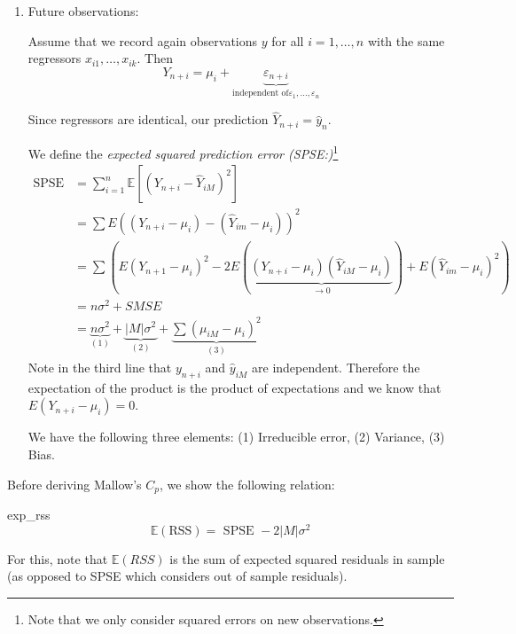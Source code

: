 \documentclass[11pt, %
	oneside, %
	english, %
	onehalfspacing, %
	]{article} %
\numberwithin{equation}{section}
\begin{document}
\begin{enumerate}
	\item Future observations:

        Assume that we record again observations $y$ for all $i = 1, \dots, n$ with the same regressors $x_{i1}, \dots, x_{ik}$. Then
        $$
        Y_{n+i}=\mu_i+\underbrace{ \varepsilon_{n+i} }_{ \text{independent of} \varepsilon_1, \dots, \varepsilon_n }
        $$

        Since regressors are identical, our prediction $\hat{Y}_{n+i} = \hat{y}_n$.

        We define the \emph{expected squared prediction error (SPSE:)}\footnote{Note that we only consider squared errors on new observations.}
        \begin{equation}\label{eq:spse_rel}
            \begin{aligned}
                \text {SPSE}& = \sum_{i=1}^n \mathbb{E}\left[\left(Y_{n+i}-\hat{Y}_{i M}\right)^2\right] \\
                & =\sum E\left(\left(Y_{n+i}-\mu_i\right)-\left(\hat{Y}_{i m}-\mu_i\right)\right)^2 \\
                & =\sum(E\left(Y_{n+1}-\mu_i\right)^2-2 E\left(\underbrace{\left(Y_{n+i} - \mu_i\right) \left( \hat{Y}_{iM} - \mu_i \right) }_{\rightarrow 0}\right)+E\left(\hat{Y}_{i m}-\mu_i\right)^2) \\
                & =n \sigma^2+S M S E \\
                &=\underbrace{ n \sigma^2 }_{ (1) }+\underbrace{ |M| \sigma^2 }_{ (2) }+\underbrace{ \sum\left(\mu_{i M}-\mu_i\right)^2 }_{ (3) }
                \end{aligned}
        \end{equation}
        Note in the third line that $y_{n+i}$ and $\hat{y}_{iM}$ are independent. Therefore the expectation of the product is the product of expectations and we know that $E(Y_{n+i} - \mu_i) = 0$.

        We have the following three elements: (1) Irreducible error, (2) Variance, (3) Bias.
\end{enumerate}

Before deriving Mallow's $C_p$, we show the following relation:

\begin{lemma}{}{exp_rss}
    $$
    \mathbb{E} (\text {RSS})=\text { SPSE }-2|M| \sigma^2
    $$
\end{lemma}

For this, note that $\mathbb{E}(RSS)$ is the sum of expected squared residuals in sample (as opposed to SPSE which considers out of sample residuals).
\end{document}
